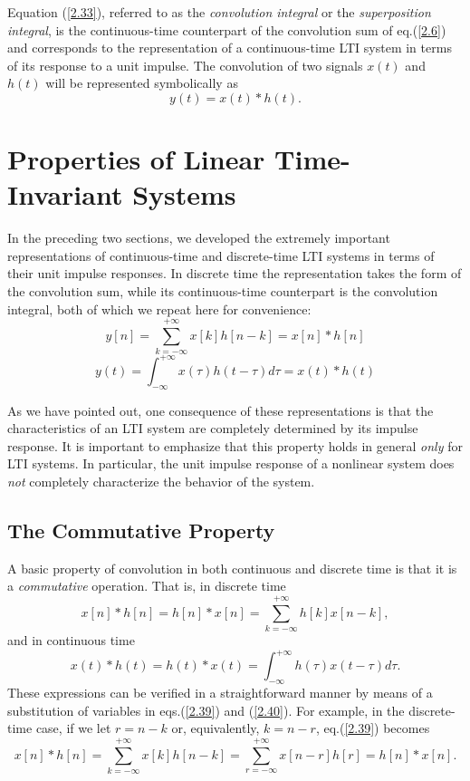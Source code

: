 \documentclass[a4paper,10pt,twoside]{book}
\begin{document}
Equation (\ref{2.33}), referred to as the \textit{convolution integral} or the \textit{superposition integral}, is the continuous-time counterpart of the convolution sum of eq.\;(\ref{2.6}) and corresponds to the representation of a continuous-time LTI system in terms of its response to a unit impulse. The convolution of two signals $x(t)$ and $h(t)$ will be represented symbolically as
\begin{equation}
    y(t)=x(t)*h(t).
    \label{2.34}
\end{equation}

\section{Properties of Linear Time-Invariant Systems}

In the preceding two sections, we developed the extremely important representations of continuous-time and discrete-time LTI systems in terms of their unit impulse responses. In discrete time the representation takes the form of the convolution sum, while its continuous-time counterpart is the convolution integral, both of which we repeat here for convenience:
\begin{equation}
    y[n] = \sum_{k=-\infty}^{+\infty}x[k]h[n-k] = x[n]*h[n]
    \label{2.39}
\end{equation}
\begin{equation}
    y(t) = \int_{-\infty}^{+\infty}x(\tau)h(t-\tau)d\tau = x(t)*h(t)
    \label{2.40}
\end{equation}

As we have pointed out, one consequence of these representations is that the characteristics of an LTI system are completely determined by its impulse response. It is important to emphasize that this property holds in general \textit{only} for LTI systems. In particular, the unit impulse response of a nonlinear system does \textit{not} completely characterize the behavior of the system.

\subsection{The Commutative Property}

A basic property of convolution in both continuous and discrete time is that it is a \textit{commutative} operation. That is, in discrete time
\begin{equation}
    x[n]*h[n]= h[n]*x[n] = \sum_{k=-\infty}^{+\infty}h[k]x[n-k],
    \label{2.43}
\end{equation}
and in continuous time
\begin{equation}
    x(t)*h(t)=h(t)*x(t)=\int_{-\infty}^{+\infty}h(\tau)x(t-\tau)d\tau.
    \label{2.44}
\end{equation}
These expressions can be verified in a straightforward manner by means of a substitution of variables in eqs.\;(\ref{2.39}) and (\ref{2.40}). For example, in the discrete-time case, if we let $r=n-k$ or, equivalently, $k=n-r$, eq.\;(\ref{2.39}) becomes
\begin{equation}
    x[n]*h[n]=\sum_{k=-\infty}^{+\infty}x[k]h[n-k]=\sum_{r=-\infty}^{+\infty}x[n-r]h[r]=h[n]*x[n].
    \label{2.45}
\end{equation}
\end{document}
